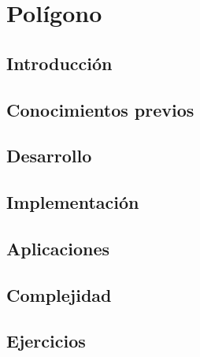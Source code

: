 \chapter{Polígono}
\section{Introducción}

\section{Conocimientos previos}

\section{Desarrollo}

\section{Implementación}

\section{Aplicaciones}

\section{Complejidad}

\section{Ejercicios}
